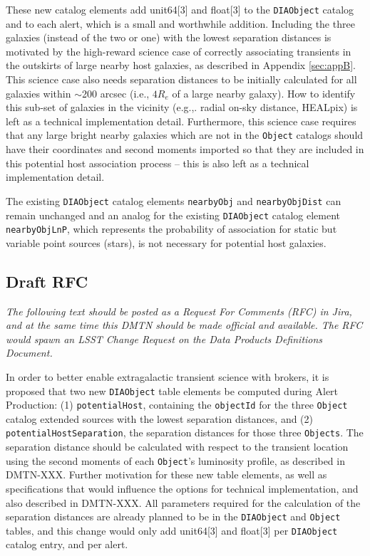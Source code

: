 \documentclass[DM,lsstdraft,authoryear,toc]{lsstdoc}
\begin{document}
These new catalog elements add unit64[3] and float[3] to the {\tt DIAObject} catalog and to each alert, which is a small and worthwhile addition.
Including the three galaxies (instead of the two or one) with the lowest separation distances is motivated by the high-reward science case of correctly associating transients in the outskirts of large nearby host galaxies, as described in Appendix \ref{sec:appB}. 
This science case also needs separation distances to be initially calculated for all galaxies within $\sim$200 arcsec (i.e., $4R_e$ of a large nearby galaxy).
How to identify this sub-set of galaxies in the vicinity (e.g.,. radial on-sky distance, HEALpix) is left as a technical implementation detail.
Furthermore, this science case requires that any large bright nearby galaxies which are not in the {\tt Object} catalogs should have their coordinates and second moments imported so that they are included in this potential host association process -- this is also left as a technical implementation detail.

The existing {\tt DIAObject} catalog elements {\tt nearbyObj} and {\tt nearbyObjDist} can remain unchanged and an analog for the existing {\tt DIAObject} catalog element {\tt nearbyObjLnP}, which represents the probability of association for static but variable point sources (stars), is not necessary for potential host galaxies.


\subsection{Draft RFC}\label{ssec:draft_rfc}

\textit{The following text should be posted as a Request For Comments (RFC) in Jira, and at the same time this DMTN should be made official and available. The RFC would spawn an LSST Change Request on the Data Products Definitions Document.}

In order to better enable extragalactic transient science with brokers, it is proposed that two new {\tt DIAObject} table elements be computed during Alert Production:
(1) {\tt potentialHost}, containing the {\tt objectId} for the three {\tt Object} catalog extended sources with the lowest separation distances, and
(2) {\tt potentialHostSeparation}, the separation distances for those three {\tt Objects}.
The separation distance should be calculated with respect to the transient location using the second moments of each {\tt Object}'s luminosity profile, as described in DMTN-XXX.
Further motivation for these new table elements, as well as specifications that would influence the options for technical implementation, and also described in DMTN-XXX.
All parameters required for the calculation of the separation distances are already planned to be in the {\tt DIAObject} and {\tt Object} tables, and this change would only add unit64[3] and float[3] per {\tt DIAObject} catalog entry, and per alert.
\end{document}

